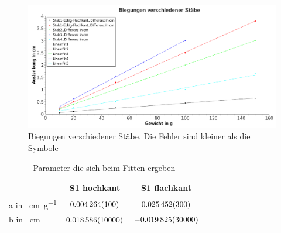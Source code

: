 \documentclass[
	a4paper,
	12pt,
	pagesize,
	ngerman
]{scrartcl}
\begin{document}
	\begin{figure}[H]
		\includegraphics[width=1\textwidth]{Biegungen}
		\centering
		\caption{Biegungen verschiedener Stäbe. Die Fehler sind kleiner als die Symbole}
		\label{BiegungGraph}
		\centering
	\end{figure}

	\begin{table}[H]
	\centering
	\begin{tabular}{ l | c | c | }
		& S1 hochkant  & S1 flachkant  \\ \hline
		a in \SI{}{\centi\meter\per\gram} & $\SI{0,004264 \pm 0,0001}{}$& $ \SI{0,025452 \pm 0,0003}{}$\\ \hline
		b in \SI{}{\centi\meter} & $\SI{0,018586 \pm 0,01}{}$  & $\SI{-0,019825 \pm 0,03}{}$  \\ \hline
	\end{tabular}
	\caption{Parameter die sich beim Fitten ergeben}
	\label{TabelleFits}
	\end{table}
\end{document}

